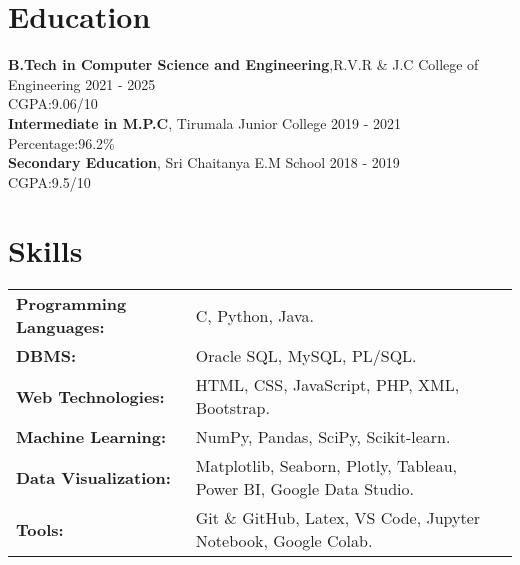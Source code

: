 \documentclass{article}
\begin{document}
\section*{Education}
\vspace{-2mm}
{\fontsize{11}{11}\selectfont \textbf{B.Tech in Computer Science and Engineering}},R.V.R \& J.C College of Engineering
\hfill2021 - 2025\\
\hspace{-1mm}
\noindent
CGPA:9.06/10\\
{\fontsize{11}{11}\selectfont \textbf{Intermediate in M.P.C}}, Tirumala Junior College
\hfill2019 - 2021\\
\hspace{-1mm}
Percentage:96.2\%\\
{\fontsize{11}{11}\selectfont \textbf{Secondary Education}}, Sri Chaitanya E.M School
\hfill2018 - 2019\\
\hspace{-1mm}
CGPA:9.5/10
\vspace{2mm}
\hline
\vspace{-2mm}
\section*{Skills}
\vspace{-2mm} %
\begin{tabularx}{\textwidth}{@{}lX@{}}
\textbf{Programming Languages:} & C, Python, Java. \\[0.1mm]
\textbf{DBMS:} & Oracle SQL, MySQL, PL/SQL. \\[0.1mm]
\textbf{Web Technologies:} & HTML, CSS, JavaScript, PHP, XML, Bootstrap. \\[0.1mm]
\textbf{Machine Learning:} & NumPy, Pandas, SciPy, Scikit-learn. \\[0.1mm]
\textbf{Data Visualization:} & Matplotlib, Seaborn, Plotly, Tableau, Power BI, Google Data Studio. \\[0.1mm]
\textbf{Tools:} & Git \& GitHub, Latex, VS Code, Jupyter Notebook, Google Colab. \\[0.1mm]
\end{tabularx}
\vspace{2mm}
\hline
\vspace{-2mm}
\end{document}
